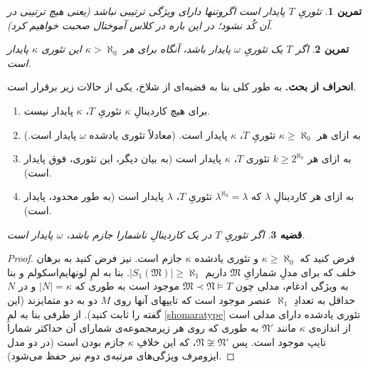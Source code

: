 \documentclass[12pt,a4paper]{report}
\theoremstyle{colorhead}
\newtheorem{thm}{قضیه}
\newtheorem{tam}[thm]{تمرین}
\begin{document}
\begin{tam}
تئوریِ
$T$
پایدار است اگروتنها دارای ویژگی ترتیبی نباشد (یعنی هیچ ترتیبی در آن کُد نشود؛ در این باره در کلاس آموختال صحبت خواهیم کرد).
\end{tam}
\begin{tam}
اگر
$T$
یک تئوریِ
$\omega$
پایدار باشد، آنگاه برای هر
$\kappa>\aleph_0$
این تئوری
$\kappa$
پایدار است. 
\end{tam}
\begin{framed}
\textbf{انحراف از بحث.}
به طور کلی بنا به قضیه‌ای از شلاخ، یکی از حالات زیر برقرار است. 
\begin{enumerate}
\item
برای هیچ کاردینالِ
$\kappa$
تئوریِ
$T$،
$\kappa$
پایدار نیست.
\item 
به ازای هر 
$\kappa\geq \aleph_0$
تئوریِ
$T$،
$\kappa$
پایدار است.
(معادلاً تئوری یادشده 
$\omega$
پایدار است.)
\item 
به ازای هر
$k\geq 2^{\aleph_0}$
تئوری
$T$،
$\kappa$
پایدار است (به بیان دیگر، این تئوری،
فوق پایدار است).
\item 
به ازای هر کاردینالِ
$\lambda$
که
$\lambda^{\aleph_0}=\lambda$
تئوریِ
$T$،
$\lambda$
پایدار است (به طور محدود، پایدار است).
\end{enumerate}
\end{framed}
\begin{thm}
اگر تئوریِ
$T$
در یک کاردینالِ ناشمارا جازم باشد،‌
$\omega$
پایدار است. 
\end{thm}
\begin{proof}
فرض کنید که
$\kappa\geq \aleph_0$
و تئوری یادشده
$\kappa$
جازم است. نیز فرض کنید به برهان خلف که برای مدلِ شمارایِ
$\mathfrak{M}$
داریم
$|S_1(\mathfrak{M})|\geq \aleph_1$.
بنا به لمِ لونهایم‌اسکولم  و بنا به ویژگی ادغام،‌ مدلی چون
$\mathfrak{M}\prec \mathfrak{N}\models T$
موجود است به طوری که
$|N|=\kappa$
و در
$N$
حداقل به تعدادِ
$\aleph_1$
عنصر موجود است که تایپهای آنها روی 
$M$
دو به دو متمایزند
 (این گفته را ثابت کنید). 
 از طرفی بنا به لمِ
 \ref{shomaratype}
 تئوری یادشده دارای مدلی است از اندازه‌ی
 $\kappa$
 مانند
 $\mathfrak{N}'$
 به طوری که روی هر زیرمجموعه‌ی شمارای آن 
 حداکثر شمارا تایپ موجود است. پس
 $\mathfrak{N}\not\cong \mathfrak{N}'$،
 که این خلافِ
 $\kappa$
 جازم بودن است (در دو مدل ایزومرف ویژگی‌های مرتبه‌ی دوم نیز حفظ می‌شود).
 \end{proof}
\end{document}
